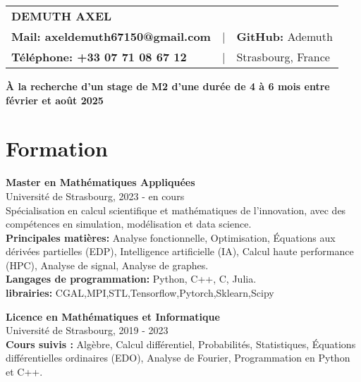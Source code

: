 \documentclass[a4paper,10pt]{article}
\begin{document}
\begin{center}
    \begin{tabular}{>{\bfseries}l c l}
        \textbf{\LARGE DEMUTH AXEL} & & \\[0.3cm]
        \textbf{Mail:} axeldemuth67150@gmail.com & | & \textbf{GitHub:} Ademuth \\[0.1cm]
        \textbf{Téléphone:} +33 07 71 08 67 12 & | & Strasbourg, France
    \end{tabular}
\end{center}

\vspace{0.5cm}

\begin{center}
    \textbf{À la recherche d'un stage de M2 d'une durée de 4 à 6 mois entre février et août 2025}
\end{center}

\vspace{0.5cm}

\section*{Formation}
\noindent
\textbf{Master en Mathématiques Appliquées} \\
Université de Strasbourg, 2023 - en cours \\
Spécialisation en calcul scientifique et mathématiques de l'innovation, avec des compétences en simulation, modélisation et data science. \\

\noindent
\textbf{Principales matières:} Analyse fonctionnelle, Optimisation, Équations aux dérivées partielles (EDP), Intelligence artificielle (IA), Calcul haute performance (HPC), Analyse de signal, Analyse de graphes. \\

\noindent
\textbf{Langages de programmation:} Python, C++, C, Julia. \\
\textbf{librairies:} CGAL,MPI,STL,Tensorflow,Pytorch,Sklearn,Scipy 
\vspace{0.1cm}

\noindent
\textbf{Licence en Mathématiques et Informatique} \\
Université de Strasbourg, 2019 - 2023 \\
\noindent
\textbf{Cours suivis :} Algèbre, Calcul différentiel, Probabilités, Statistiques, Équations différentielles ordinaires (EDO), Analyse de Fourier, Programmation en Python et C++. \\
\end{document}

